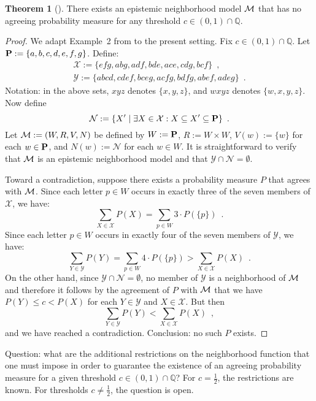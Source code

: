 \documentclass[12pt]{article}
\theoremstyle{definition}
\newtheorem{theorem}{Theorem}[section]
\newcommand{\Rat}{\mathbb{Q}}  %
\newcommand{\M}{{\cal M}}      %
\newcommand{\Prop}{{\bf P}}    %
\begin{document}
\begin{theorem}[\cite{WalleyFine1979:vomacp}]
  \label{theorem:walleyfine}
  There exists an epistemic neighborhood model $\M$ that has no
  agreeing probability measure for any threshold $c\in(0,1)\cap\Rat$.
\end{theorem}
\begin{proof}
  We adapt Example~2 from \cite[pp.~344-345]{WalleyFine1979:vomacp} to
  the present setting.  Fix $c\in(0,1)\cap\Rat$.  Let
  $\Prop:=\{a,b,c,d,e,f,g\}$. Define:
  \begin{gather*}
    \mathcal{X} := \{efg, abg, adf, bde, ace, cdg, bcf\}\enspace,
    \\
    \mathcal{Y} := \{abcd, cdef, bceg, acfg, bdfg, abef, adeg \}\enspace.
  \end{gather*}
  Notation: in the above sets, $xyz$ denotes $\{x,y,z\}$, and $wxyz$
  denotes $\{w,x,y,z\}$.  Now define
  \[
  \mathcal{N} := \{ X' \mid \exists X \in \mathcal{X}: X \subseteq X'
  \subseteq\Prop \}\enspace.
  \]
  Let $\M:=(W,R,V,N)$ be defined by $W:=\Prop$, $R:=W\times W$,
  $V(w):=\{w\}$ for each $w\in\Prop$, and $N(w) := \mathcal{N}$ for
  each $w \in W$.  It is straightforward to verify that $\M$ is an
  epistemic neighborhood model and that
  $\mathcal{Y} \cap \mathcal{N} = \emptyset$.

  Toward a contradiction, suppose there exists a probability measure
  $P$ that agrees with $\M$. Since each letter $p\in W$ occurs in
  exactly three of the seven members of $\mathcal{X}$, we have:
  \[
  \sum_{X \in \mathcal{X}} P(X) = \sum_{p\in W}3\cdot P(\{p\})\enspace.
  \]
  Since each letter $p\in W$ occurs in exactly four of the seven
  members of $\mathcal{Y}$, we have:
  \[
  \sum_{Y \in \mathcal{Y}} P(Y) = \sum_{p\in W} 4\cdot P(\{p\})
  > \sum_{X \in \mathcal{X}} P(X)\enspace.
  \]
  On the other hand, since $\mathcal{Y}\cap\mathcal{N}=\emptyset$, no
  member of $\mathcal{Y}$ is a neighborhood of $\M$ and therefore it
  follows by the agreement of $P$ with $\M$ that we have
  $P(Y)\leq c<P(X)$ for each $Y\in\mathcal{Y}$ and $X\in\mathcal{X}$.
  But then
  \[
  \sum_{Y\in\mathcal{Y}}P(Y) < \sum_{X\in\mathcal{X}}P(X)\enspace,
  \]
  and we have reached a contradiction. Conclusion: no such $P$ exists.
\end{proof}

Question: what are the additional restrictions on the neighborhood
function that one must impose in order to guarantee the existence of
an agreeing probability measure for a given threshold
$c\in(0,1)\cap\Rat$?  For $c=\frac 12$, the restrictions are known.
For thresholds $c\neq\frac 12$, the question is open.
\end{document}
